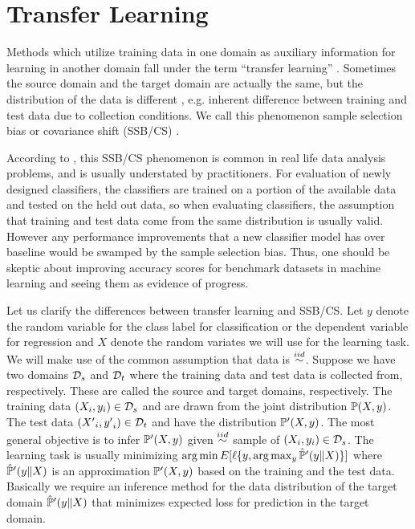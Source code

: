 \documentclass[12pt,oneside,final]{thesis}\usepackage[]{graphicx}\usepackage[]{color}
\begin{document}
\section[Transfer Learning and Domain Adaptation]{Transfer Learning \label{sec:translearn}}

Methods which utilize training data in one domain  as auxiliary information for  learning  in another domain fall under the term ``transfer learning'' \cite{TransLearnSurvey}. Sometimes the source domain and the target domain are actually the same, but the distribution of the data is different , e.g. inherent difference between training and test data due to collection conditions. We call this phenomenon sample selection bias or covariance shift (SSB/CS) \cite{Zadrozny2004a,TransLearnSurvey}.

According to \cite{Hand2006a}, this SSB/CS phenomenon is common in real life data analysis problems, and is usually understated by practitioners. For evaluation of newly designed classifiers, the classifiers are trained on a portion of the available data and tested on the held out data, so when evaluating classifiers, the assumption that training and test data come from the same distribution is usually valid. However any performance improvements that a new classifier model has over baseline would be swamped  by the sample selection bias. Thus, one should be skeptic about improving accuracy scores for benchmark datasets in machine learning and seeing them as evidence of progress.

Let us clarify the differences between transfer learning  and SSB/CS.  Let $y$ denote the random variable for the class label  for classification or the dependent variable for regression and $X$ denote the random variates we will use for the learning task. We will  make use of  the common assumption that data is $\stackrel{iid}{\sim}$.  
Suppose we have two domains  ${\mathcal{D}}_s$ and ${\mathcal{D}}_t$ where the training data and test data is collected from, respectively. These are called the source and target domains, respectively.
The training data $\left(X_i,y_i\right) \in {\mathcal{D}}_s$ and are drawn from the joint distribution $\mathbb{P}(X,y)$. 
The test data $\left({X'}_i,{y'}_i\right) \in {\mathcal{D}}_t$ and have the distribution $\mathbb{P}'(X,y)$.
The most general objective is to infer $\mathbb{P}'(X,y)$  given $\stackrel{iid}{\sim}$ sample of $\left(X_i,y_i\right) \in {\mathcal{D}}_s$. 
The learning task is usually minimizing  $\arg\min E[\ell\{y, \arg\max_y{\hat{\mathbb{P}}'(y \| X) } \}]$  
where $\hat{\mathbb{P}}'(y \| X)$  is an approximation  $\mathbb{P}'(X,y)$ based on the training and the test data. Basically we require an inference method for the data distribution of the target domain   $\hat{\mathbb{P}}'(y \| X)$ that minimizes expected loss for prediction in the target domain.
\end{document}
